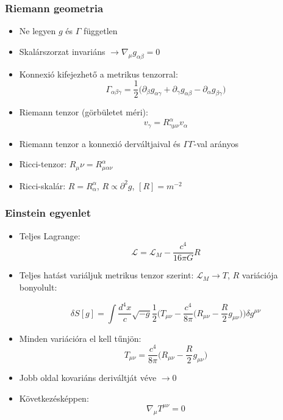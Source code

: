 \documentclass{beamer}
\begin{document}
\begin{frame}
\frametitle{Riemann geometria}
\begin{itemize}
  \setlength{\itemsep}{10pt}
  	\item Ne legyen $g$ és $\Gamma$ független
  	\item Skalárszorzat invariáns $\rightarrow \nabla_\mu g_{\alpha\beta}=0$ 
  	\item Konnexió kifejezhető a metrikus tenzorral:
  	\begin{equation}
  		\Gamma_{\alpha\beta\gamma} = \frac{1}{2}\big(\partial_\beta g_{\alpha\gamma}+\partial_\gamma g_{\alpha\beta} - \partial_\alpha g_{\beta\gamma}\big)
  	\end{equation}
  	\item Riemann tenzor (görbületet méri): 
  	\begin{equation}
  	 [\nabla_\mu, \nabla_\nu]v_\gamma = R^\alpha_{\gamma\mu\nu}v_\alpha
  	\end{equation}
  	\item Riemann tenzor a konnexió derváltjaival és $\Gamma\Gamma$-val arányos
  	\item Ricci-tenzor: $R_\mu\nu = R^\alpha_{\mu\alpha\nu}$
  	\item Ricci-skalár: $R=R^\alpha_\alpha$, $R\propto \partial^2 g$, $[R]=m^{-2}$
\end{itemize}
\end{frame}

\begin{frame}
\frametitle{Einstein egyenlet}
\begin{itemize}
  \setlength{\itemsep}{10pt}
  	\item Teljes Lagrange:
  	\begin{equation}
  	\mathcal{L}=\mathcal{L}_M-\frac{c^4}{16\pi G}R
  	\end{equation}
	\item Teljes hatást variáljuk metrikus tenzor szerint: $\mathcal{L}_M\rightarrow T$, $R$ variációja bonyolult:
	
	\begin{equation}
	\delta S[g] = \int \frac{d^4x}{c}\sqrt{-g}\frac{1}{2}\bigg(T_{\mu\nu}-\frac{c^4}{8\pi}\Big(R_{\mu\nu}-\frac{R}{2}g_{\mu\nu}\Big)\bigg)\delta g^{\mu\nu}
	\end{equation}
	\item Minden variációra el kell tűnjön:
	\begin{equation}
	T_{\mu\nu}=\frac{c^4}{8\pi}\Big(R_{\mu\nu}-\frac{R}{2}g_{\mu\nu}\Big)
	\end{equation}
	\item Jobb oldal kovariáns deriváltját véve $\rightarrow 0$
	\item Következésképpen:
	\begin{equation}
		\nabla_\mu T^{\mu\nu} = 0
\end{equation}	 
\end{itemize}
\end{frame}
\end{document}
